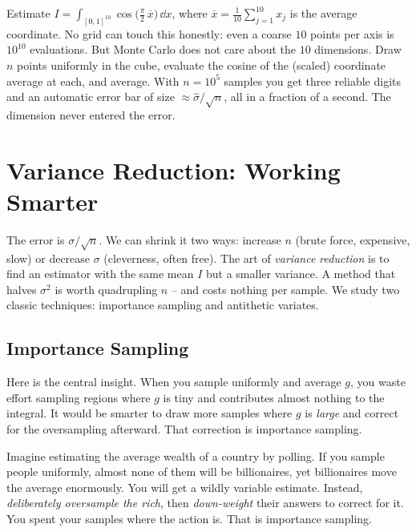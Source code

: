 \begin{example}
\label{ch35:ex-highdim}
Estimate $I = \int_{[0,1]^{10}} \cos\!\bigl(\tfrac{\pi}{2}\,\overline{x}\bigr)\,\dd x$,
where $\overline{x} = \frac{1}{10}\sum_{j=1}^{10} x_j$ is the average coordinate.
No grid can touch this honestly: even a coarse $10$ points per axis is
$10^{10}$ evaluations. But Monte Carlo does not care about the $10$ dimensions.
Draw $n$ points uniformly in the cube, evaluate the cosine of the (scaled)
coordinate average at each, and average. With $n = 10^5$ samples you get three
reliable digits and an automatic error bar of size $\approx \hat\sigma/\sqrt{n}$,
all in a fraction of a second. The dimension never entered the error.
\end{example}

\section{Variance Reduction: Working Smarter}
\label{ch35:variance-reduction}

The error is $\sigma/\sqrt n$. We can shrink it two ways: increase $n$ (brute
force, expensive, slow) or decrease $\sigma$ (cleverness, often free). The art of
\emph{variance reduction} is to find an estimator with the same mean $I$ but a
smaller variance. A method that halves $\sigma^2$ is worth quadrupling $n$ -- and
costs nothing per sample. We study two classic techniques: importance sampling
and antithetic variates.

\subsection{Importance Sampling}
\label{ch35:importance}

Here is the central insight. When you sample uniformly and average $g$, you waste
effort sampling regions where $g$ is tiny and contributes almost nothing to the
integral. It would be smarter to draw more samples where $g$ is \emph{large} and
correct for the oversampling afterward. That correction is importance sampling.

\begin{intuitionbox}
Imagine estimating the average wealth of a country by polling. If you sample
people uniformly, almost none of them will be billionaires, yet billionaires
move the average enormously. You will get a wildly variable estimate. Instead,
\emph{deliberately oversample the rich}, then \emph{down-weight} their answers to
correct for it. You spent your samples where the action is. That is importance
sampling.
\end{intuitionbox}

